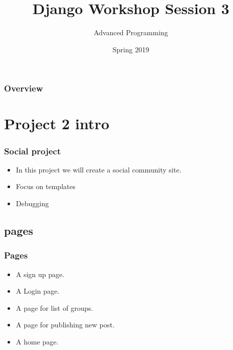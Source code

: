 \documentclass{beamer}
\title[Django Workshop]{Django Workshop Session 3} %
\author{Advanced Programming} %
\institute[AUT] %
{
	Amirkabir University of Technology\\ %
	\medskip
	\textit{} %
}
\date{Spring 2019} %
\begin{document}
	
	\begin{frame}
		\titlepage %
	\end{frame}

	\begin{frame}
	\frametitle{Overview} %
	\tableofcontents %
	\end{frame}


\section{Project 2 intro}
\begin{frame}
\frametitle{Social project}
	\begin{itemize}
		\centering
		\large
		\item In this project we will create a social community site.
		\item Focus on templates
		\item Debugging
	\end{itemize}
\end{frame}

\subsection{pages}
\begin{frame}
\frametitle{Pages}
\begin{itemize}
	\item A sign up page.
	\item A Login page.
	\item A page for list of groups.
	\item A page for publishing new post.
	\item A home page.
\end{itemize}
\end{frame}
\end{document}

